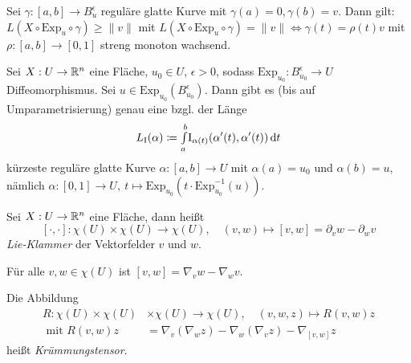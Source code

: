 \documentclass{cheat-sheet}
\newcommand{\I}{\mathrm{I}}
\newcommand{\Exp}{\mathrm{Exp}} %
\begin{document}
\begin{satz}
  Sei $\gamma : [a, b] \to B_u^\epsilon$ reguläre glatte Kurve mit $\gamma(a) = 0, \gamma(b) = v$. Dann gilt: $L(X \circ \Exp_u \circ \gamma) \geq \|v\|$ mit $L(X \circ \Exp_u \circ \gamma) = \|v\| \iff \gamma(t) = \rho(t)v$ mit $\rho : [a, b] \to [0, 1]$ streng monoton wachsend.
\end{satz}

\begin{satz}
  Sei $X : U \to \mathbb{R}^n$ eine Fläche, $u_0 \in U$, $\epsilon > 0$, sodass $\Exp_{u_0} : B_{u_0}^{\epsilon} \to U$ Diffeomorphismus. Sei $u \in \Exp_{u_0}(B_{u_0}^{\epsilon})$. Dann gibt es (bis auf Umparametrisierung) genau eine bzgl. der Länge
  \[ L_\I(\alpha) \coloneqq \Int{a}{b}{\I_{\alpha(t)}(\alpha'(t), \alpha'(t))}{t} \]
  kürzeste reguläre glatte Kurve $\alpha : [a, b] \to U$ mit $\alpha(a) = u_0$ und $\alpha(b) = u$, nämlich $\alpha : [0, 1] \to U, \  t \mapsto \Exp_{u_0}(t \cdot \Exp_{u_0}^{-1}(u))$.
\end{satz}



\begin{defn}
  Sei $X : U \to \mathbb{R}^n$ eine Fläche, dann heißt
  \[
    [\cdot,\cdot] : \chi(U) \times \chi(U) \to \chi(U), \quad
    (v, w) \mapsto [v, w] = \partial_v w - \partial_w v
  \]
  \emph{Lie-Klammer} der Vektorfelder $v$ und $w$.
\end{defn}

\begin{satz}
  Für alle $v, w \in \chi(U)$ ist $[v, w] = \nabla_v w - \nabla_w v$.
\end{satz}


\begin{defn}
  Die Abbildung
  \begin{align*}
    R : \chi(U) \times \chi(U) &\times \chi(U) \to \chi(U), \quad (v, w, z) \mapsto R(v, w) z \\
    \text{ mit } R(v, w) z &= \nabla_v (\nabla_w z) - \nabla_w (\nabla_v z) - \nabla_{[v, w]} z
  \end{align*}
  heißt \emph{Krümmungstensor}.
\end{defn}
\end{document}
